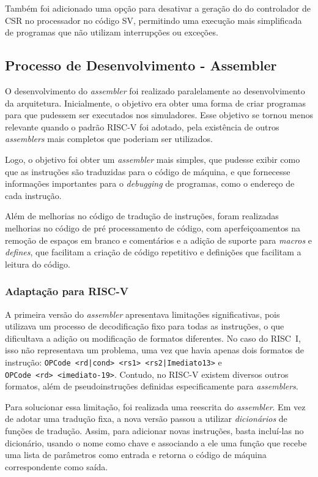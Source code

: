 \documentclass[
	12pt,				%
	openright,			%
	oneside,			%
	a4paper,			%
	english,			%
	french,				%
	spanish,			%
	brazil,				%
	]{abntex2}
\begin{document}
Também foi adicionado uma opção para desativar a geração do do controlador de CSR no processador no código SV, permitindo uma execução mais simplificada de programas que não utilizam interrupções ou exceções.

\subsection{Processo de Desenvolvimento - Assembler}\label{process_assembler}

O desenvolvimento do \textit{assembler} foi realizado paralelamente ao desenvolvimento da arquitetura. Inicialmente, o objetivo era obter uma forma de criar programas para que pudessem ser executados nos simuladores. Esse objetivo se tornou menos relevante quando o padrão RISC-V foi adotado, pela existência de outros \textit{assemblers} mais completos que poderiam ser utilizados.

Logo, o objetivo foi obter um \textit{assembler} mais simples, que pudesse exibir como que as instruções são traduzidas para o código de máquina, e que fornecesse informações importantes para o \textit{debugging} de programas, como o endereço de cada instrução.

Além de melhorias no código de tradução de instruções, foram realizadas melhorias no código de pré processamento de código, com aperfeiçoamentos na remoção de espaços em branco e comentários e a adição de suporte para \textit{macros} e \textit{defines}, que facilitam a criação de código repetitivo e definições que facilitam a leitura do código.

\subsubsection{Adaptação para RISC-V}

A primeira versão do \textit{assembler} apresentava limitações significativas, pois utilizava um processo de decodificação fixo para todas as instruções, o que dificultava a adição ou modificação de formatos diferentes. No caso do RISC~I, isso não representava um problema, uma vez que havia apenas dois formatos de instrução: \texttt{OPCode~<rd|cond>~<rs1>~<rs2|Imediato13>} e \texttt{OPCode~<rd>~<imediato-19>}. Contudo, no RISC-V existem diversos outros formatos, além de pseudoinstruções definidas especificamente para \textit{assemblers}\cite{risc-v_risc-v_2025}.

Para solucionar essa limitação, foi realizada uma reescrita do \textit{assembler}. Em vez de adotar uma tradução fixa, a nova versão passou a utilizar \textit{dicionários} de funções de tradução. Assim, para adicionar novas instruções, basta incluí-las no dicionário, usando o nome como chave e associando a ele uma função que recebe uma lista de parâmetros como entrada e retorna o código de máquina correspondente como saída.
\end{document}
